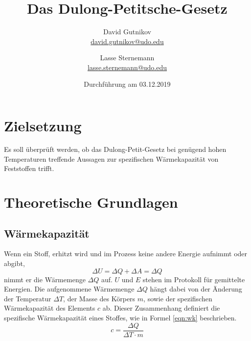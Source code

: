 \documentclass[titlepage = firstcover]{scrartcl}
\title{Das Dulong-Petitsche-Gesetz}
\author{
  David Gutnikov\\
  \href{mailto:david.gutnikov@udo.edu}{david.gutnikov@udo.edu}
 \and 
  Lasse Sternemann\\
  \href{mailto:lasse.sternemann@udo.edu}{lasse.sternemann@udo.edu}
}
\date{Durchführung am 03.12.2019}
\begin{document}
    \maketitle
    \tableofcontents
    \newpage

    \section{Zielsetzung}
        Es soll überprüft werden, ob das Dulong-Petit-Gesetz bei genügend hohen Temperaturen treffende Aussagen zur spezifischen
        Wärmekapazität von Feststoffen trifft.



    \section{Theoretische Grundlagen}
        \subsection{Wärmekapazität}
            Wenn ein Stoff, erhitzt wird und im Prozess keine andere Energie aufnimmt oder abgibt,
            \begin{equation*}
                \Delta U = \Delta Q + \Delta A = \Delta Q
            \end{equation*}
            nimmt er die Wärmemenge $\Delta Q$ auf. $U$ und $E$ stehen im Protokoll für gemittelte Energien.
            Die aufgenommene Wärmemenge $\Delta Q$ hängt dabei von der Änderung der Temperatur $\Delta T$,
            der Masse des Körpers $m$, sowie der spezifischen Wärmekapazität des Elements $c$ ab. Dieser Zusammenhang definiert die spezifische
            Wärmekapazität eines Stoffes, wie in Formel \eqref{eqn:wk} beschrieben.  
            \begin{equation}
                c = \frac{\Delta Q}{\Delta T \cdot m }
                \label{eqn:wk}
            \end{equation}
        
\end{document}
